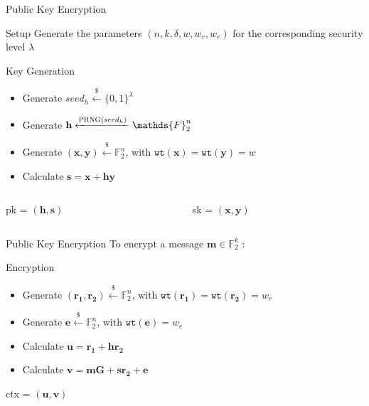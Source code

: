 \begin{frame}{Public Key Encryption}
    \begin{block}{Setup}
        Generate the parameters $(n, k, \delta, w, w_r, w_e)$ for the corresponding security level $\lambda$
    \end{block}
    \begin{block}{Key Generation}
        \begin{itemize}
            \item Generate $seed_h \xleftarrow{\$} \lbrace 0, 1 \rbrace^\lambda$
            \item Generate $\mathbf{h} \xleftarrow{\text{\sc PRNG}(seed_h)} \mathds{F}_2^n$ 
            \item Generate $(\mathbf{x, y}) \xleftarrow{\$} \mathds{F}_2^n$, with $\mathtt{wt}(\mathbf{x}) = \mathtt{wt}({\mathbf{y}}) = w$
            \item Calculate $\mathbf{s = x + hy}$
        \end{itemize}
        \begin{columns}
            \begin{column}{0.45\linewidth}
                \begin{center}
                    \textsf{pk} = $(\mathbf{h, s})$
                \end{center}
            \end{column}
            \begin{column}{0.45\linewidth}
                \begin{center}
                    \textsf{sk} = $(\mathbf{x, y})$
                \end{center}
            \end{column}
        \end{columns}
    \end{block}
\end{frame}

\begin{frame}{Public Key Encryption}
    To encrypt a message $\mathbf{m} \in \mathds{F}_2^k$ :
    \begin{block}{Encryption}
        \begin{itemize}
            \item Generate $(\mathbf{r_1, r_2}) \xleftarrow{\$} \mathds{F}_2^n$, with $\mathtt{wt}(\mathbf{r_1}) = \mathtt{wt}({\mathbf{r_2}}) = w_r$
            \item Generate $\mathbf{e} \xleftarrow{\$} \mathds{F}_2^n$, with $\mathtt{wt}(\mathbf{e}) = w_e$
            \item Calculate $\mathbf{u = r_1 + hr_2}$
            \item Calculate $\mathbf{v = mG +sr_2 + e}$
        \end{itemize}
        \begin{center}
            \textsf{ctx} = $(\mathbf{u, v})$
        \end{center}
    \end{block}
\end{frame}


